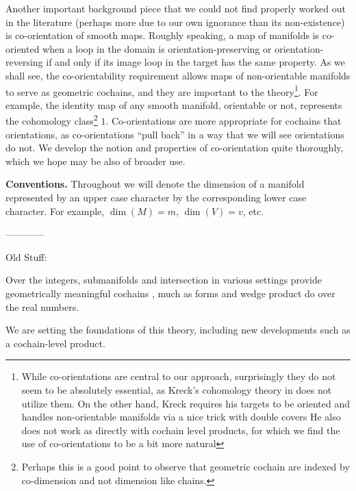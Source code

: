Another important background piece that we could not find properly worked out in the literature (perhaps more due to our own ignorance than its non-existence) is co-orientation of smooth maps.
Roughly speaking, a map of manifolds is co-oriented when a loop in the domain is orientation-preserving or orientation-reversing if and only if its image loop in the target has the same property.
As we shall see, the co-orientability requirement allows maps of non-orientable manifolds to serve as geometric cochains, and they are important to the theory\footnote{While co-orientations are central to our approach, surprisingly they do not seem to be absolutely essential, as Kreck's cohomology theory in \cite{Krec10} does not utilize them.
On the other hand, Kreck requires his targets to be oriented and handles non-orientable manifolds via a nice trick with double covers  He also does not work as directly with cochain level products, for which we find the use of co-orientations to be a bit more natural}.
For example, the identity map of any smooth manifold, orientable or not, represents the cohomology class\footnote{Perhaps this is a good point to observe that geometric cochain are indexed by co-dimension and not dimension like chains.} $1$.
Co-orientations are more appropriate for cochains that orientations, as co-orientations ``pull back'' in a way that we will see orientations do not.
We develop the notion and properties of co-orientation quite thoroughly, which we hope may be also of broader use.

\textbf{Conventions.} Throughout we will denote the dimension of a manifold represented by an upper case character by the corresponding lower case character.
For example, $\dim(M)=m$, $\dim(V)=v$, etc.

------------

Old Stuff:


Over the integers, submanifolds and intersection in various settings provide geometrically meaningful cochains \cite{Lipy14, Joyc15},
much as forms and wedge product do over the real numbers.

We are setting the foundations of this theory, including new developments such as a cochain-level product.


